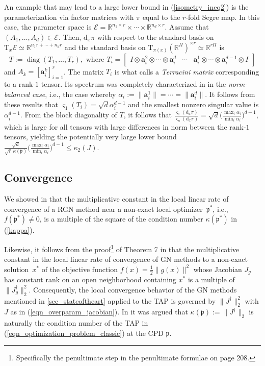 \documentclass[a4paper,10pt,final]{siamart1116}
\newcommand{\tuple}[1]{\mathfrak{#1}}
\newcommand{\Var}[1]{\mathcal{#1}}
\newcommand{\vect}[1]{\mathbf{#1}}
\newcommand{\sten}[3]{\vect{#1}_{#2}^{#3}}
\newcommand{\Tang}[2]{\mathrm{T}_{#1} {#2}}
\newcommand{\deriv}[2]{\mathrm{d}_{#1}#2}
\newcommand{\R}{\mathbb{R}}
\newcommand{\refeqn}[1]{{(\ref{#1})}}
\newcommand{\refsec}[1]{{\cref{#1}}}
\numberwithin{equation}{section}
\numberwithin{figure}{section}
\numberwithin{table}{section}
\numberwithin{theorem}{section}
\begin{document}
An example that may lead to a large lower bound in \refeqn{isometry_ineq2} is the parameterization via factor matrices with $\pi$ equal to the $r$-fold Segre map. In this case, the parameter space is $\Var{E} = \R^{n_1 \times r} \times \cdots \times \R^{n_d \times r}$. Assume that $(A_1, \ldots, A_d) \in \Var{E}$. Then, $\deriv{x}{\pi}$ with respect to the standard basis on $\Tang{x}{\Var{E}} \simeq \R^{n_1 r + \cdots + n_d r}$ and the standard basis on $\Tang{\pi(x)}{(\R^{\Pi})^{\times r}} \simeq \R^{r \Pi}$ is
\[
 T := \operatorname{diag}( T_1, \ldots, T_r ), \text{ where } T_i = \begin{bmatrix} I \otimes \sten{a}{i}{2} \otimes \cdots \otimes \sten{a}{i}{d} & \cdots & \sten{a}{i}{1} \otimes \cdots \otimes \sten{a}{i}{d-1} \otimes I \end{bmatrix}
\]
and $A_k = [\sten{a}{i}{k}]_{i=1}^r$. The matrix $T_i$ is what \cite{V2017} calls a \emph{Terracini matrix} corresponding to a rank-$1$ tensor. Its spectrum was completely characterized in \cite[corollary 18]{V2017} in the \emph{norm-balanced case}, i.e., the case whereby $\alpha_i := \|\sten{a}{i}{1}\| = \cdots = \|\sten{a}{i}{d}\|$. It follows from these results that $\varsigma_1(T_i) = \sqrt{d} \alpha_i^{d-1}$ and the smallest nonzero singular value is $\alpha_i^{d-1}$. From the block diagonality of $T$, it follows that $\frac{\varsigma_{1}(\deriv{x}{\pi})}{\varsigma_{n}(\deriv{x}{\pi})} = \sqrt{d} \bigl( \frac{\max_i \alpha_i}{\min_i \alpha_i} \bigr)^{d-1}$, which is large for all tensors with large differences in norm between the rank-$1$ tensors, yielding the potentially very large lower bound
\(
 \frac{\sqrt{d}}{\sqrt{r} \, \kappa(\tuple{p})} \bigl( \frac{\max_i \alpha_i}{\min_i \alpha_i} \bigr)^{d-1} \le \kappa_2( J ).
\)

\subsection{Convergence} \label{sec_convergence}
We showed in \cite{BV2017bis} that the multiplicative constant in the local linear rate of convergence of a RGN method near a non-exact local optimizer~$\tuple{p}^*$, i.e., $f(\tuple{p}^*)\ne0$, is a multiple of the square of the condition number $\kappa(\tuple{p}^*)$ in \refeqn{kappa}.

Likewise, it follows from the proof\footnote{Specifically the penultimate step in the penultimate formulae on page 208.} of Theorem 7 in \cite{DK2002} that the multiplicative constant in the local linear rate of convergence of GN methods to a non-exact solution~$x^*$ of the objective function $f(x) = \frac{1}{2}\|g(x)\|^2$ whose Jacobian $J_g$ has constant rank on an open neighborhood containing $x^*$ is a multiple of $\|J_g^\dagger\|_2^2$. Consequently, the local convergence behavior of the GN methods mentioned in \refsec{sec_stateoftheart} applied to the TAP is governed by $\|J^\dagger\|_2^2$ with $J$ as in \refeqn{eqn_overparam_jacobian}. In \cite{V2017} it was argued that $\kappa(\tuple{p}) := \|J^\dagger\|_2$ is naturally the condition number of the TAP in \refeqn{eqn_optimization_problem_classic} at the CPD $\tuple{p}$.
\end{document}
